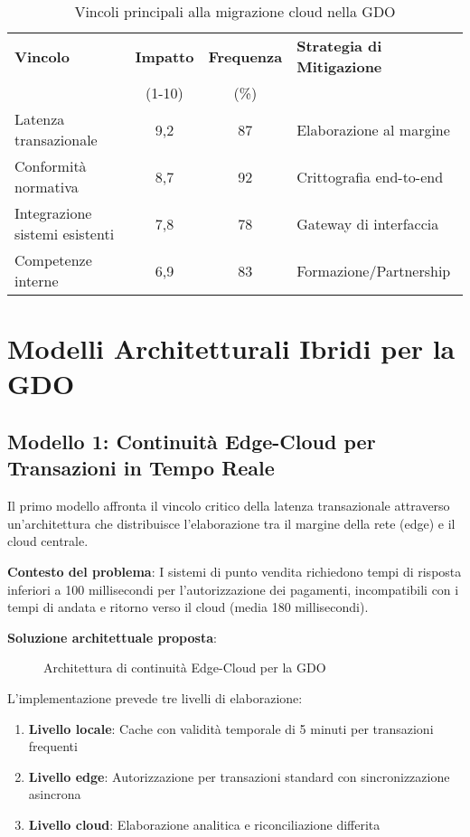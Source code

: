 \begin{table}[htbp]
\centering
\caption{Vincoli principali alla migrazione cloud nella GDO}
\label{tab:vincoli-migrazione}
\begin{tabular}{p{3.5cm}ccp{3.5cm}}
\toprule
\textbf{Vincolo} & \textbf{Impatto} & \textbf{Frequenza} & \textbf{Strategia di Mitigazione} \\
 & (1-10) & (\%) & \\
\midrule
Latenza transazionale & 9,2 & 87 & Elaborazione al margine \\
Conformità normativa & 8,7 & 92 & Crittografia end-to-end \\
Integrazione sistemi esistenti & 7,8 & 78 & Gateway di interfaccia \\
Competenze interne & 6,9 & 83 & Formazione/Partnership \\
\bottomrule
\end{tabular}
\end{table}

\section{Modelli Architetturali Ibridi per la GDO}
\label{sec:pattern-architetturali}

\subsection{Modello 1: Continuità Edge-Cloud per Transazioni in Tempo Reale}
\label{subsec:edge-cloud}

Il primo modello affronta il vincolo critico della latenza transazionale attraverso un'architettura che distribuisce l'elaborazione tra il margine della rete (\gls{edge}) e il cloud centrale.

\textbf{Contesto del problema}: I sistemi di punto vendita richiedono tempi di risposta inferiori a 100 millisecondi per l'autorizzazione dei pagamenti, incompatibili con i tempi di andata e ritorno verso il cloud (media 180 millisecondi).

\textbf{Soluzione architettuale proposta}:

\begin{figure}[htbp]
\centering
\caption{Architettura di continuità Edge-Cloud per la GDO}
\label{fig:edge-cloud}
\end{figure}

L'implementazione prevede tre livelli di elaborazione:
\begin{enumerate}
    \item \textbf{Livello locale}: Cache con validità temporale di 5 minuti per transazioni frequenti
    \item \textbf{Livello edge}: Autorizzazione per transazioni standard con sincronizzazione asincrona
    \item \textbf{Livello cloud}: Elaborazione analitica e riconciliazione differita
\end{enumerate}

